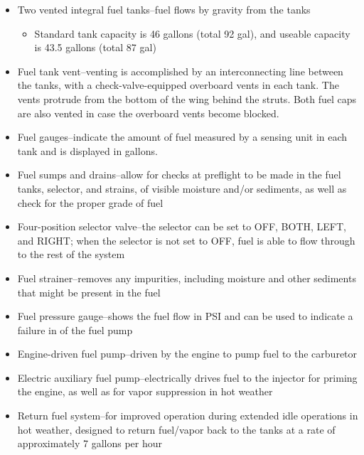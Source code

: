 \begin{itemize}
  \item Two vented integral fuel tanks--fuel flows by gravity from the tanks
    \begin{itemize}
      \item Standard tank capacity is 46 gallons (total 92 gal), and
        useable capacity is 43.5 gallons (total 87 gal)
    \end{itemize}

  \item Fuel tank vent--venting is accomplished by an interconnecting line
    between the tanks, with a check-valve-equipped overboard vents in each
    tank. The vents protrude from the bottom of the wing behind the struts.
    Both fuel caps are also vented in case the overboard vents become blocked.

  \item Fuel gauges--indicate the amount of fuel measured by a sensing unit
    in each tank and is displayed in gallons.

  \item Fuel sumps and drains--allow for checks at preflight to be made in
    the fuel tanks, selector, and strains, of visible moisture and/or
    sediments, as well as check for the proper grade of fuel

  \item Four-position selector valve--the selector can be set to OFF, BOTH,
    LEFT, and RIGHT; when the selector is not set to OFF, fuel is able to
    flow through to the rest of the system

  \item Fuel strainer--removes any impurities, including moisture and other
    sediments that might be present in the fuel

  \item Fuel pressure gauge--shows the fuel flow in PSI and can be used to
    indicate a failure in of the fuel pump

  \item Engine-driven fuel pump--driven by the engine to pump fuel to the
    carburetor

  \item Electric auxiliary fuel pump--electrically drives fuel to the injector
    for priming the engine, as well as for vapor suppression in hot weather

  \item Return fuel system--for improved operation during extended idle
    operations in hot weather, designed to return fuel/vapor back to the tanks
    at a rate of approximately 7 gallons per hour
\end{itemize}

